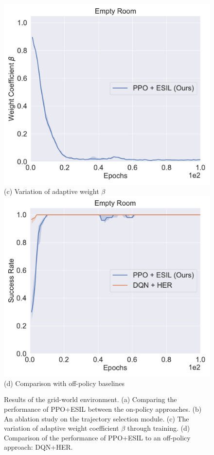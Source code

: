 \begin{figure}[h!]
%
  \centering
  \includegraphics[width=\linewidth]{figures/chapter3/empty_room_samples.pdf}
  ({c}) Variation of adaptive weight $\beta$
\endminipage
{}%
  \centering
  \includegraphics[width=\linewidth]{figures/chapter3/empty_room_her.pdf}
  ({d}) Comparison with off-policy baselines
\endminipage\hfill
\caption{Results of the grid-world environment. ({a}) Comparing the performance of PPO+ESIL between the on-policy approaches. ({b}) An ablation study on the trajectory selection module. ({c}) The variation of adaptive weight coefficient $\beta$ through training. ({d}) Comparison of the performance of PPO+ESIL to an off-policy approach: DQN+HER.}
\label{fig:toy_results}
\end{figure}

